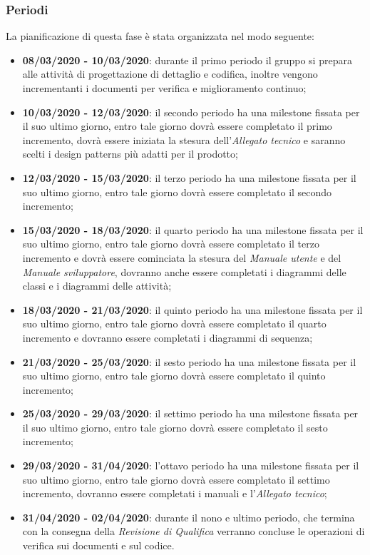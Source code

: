 \subsubsection{Periodi}
La pianificazione di questa fase è stata organizzata nel modo seguente:
\begin{itemize}
\item \textbf{08/03/2020 - 10/03/2020}: durante il primo periodo il gruppo si prepara alle attività di progettazione di dettaglio e codifica, inoltre vengono incrementanti i documenti per verifica e miglioramento continuo;

\item \textbf{10/03/2020 - 12/03/2020}: il secondo periodo ha una milestone fissata per il suo ultimo giorno, entro tale giorno dovrà essere completato il primo incremento, dovrà essere iniziata la stesura dell'\textit{Allegato tecnico} e saranno scelti i design patterns più adatti per il prodotto;

\item \textbf{12/03/2020 - 15/03/2020}: il terzo periodo ha una milestone fissata per il suo ultimo giorno, entro tale giorno dovrà essere completato il secondo incremento;

\item \textbf{15/03/2020 - 18/03/2020}: il quarto periodo ha una milestone fissata per il suo ultimo giorno, entro tale giorno dovrà essere completato il terzo incremento e dovrà essere cominciata la stesura del \textit{Manuale utente} e del \textit{Manuale sviluppatore}, dovranno anche essere completati i diagrammi delle classi e i diagrammi delle attività;

\item \textbf{18/03/2020 - 21/03/2020}: il quinto periodo ha una milestone fissata per il suo ultimo giorno, entro tale giorno dovrà essere completato il quarto incremento e dovranno essere completati i diagrammi di sequenza;

\item \textbf{21/03/2020 - 25/03/2020}: il sesto periodo ha una milestone fissata per il suo ultimo giorno, entro tale giorno dovrà essere completato il quinto incremento;

\item \textbf{25/03/2020 - 29/03/2020}: il settimo periodo ha una milestone fissata per il suo ultimo giorno, entro tale giorno dovrà essere completato il sesto incremento;

\item \textbf{29/03/2020 - 31/04/2020}: l'ottavo periodo ha una milestone fissata per il suo ultimo giorno, entro tale giorno dovrà essere completato il settimo incremento, dovranno essere completati i manuali e l'\textit{Allegato tecnico};

\item \textbf{31/04/2020 - 02/04/2020}: durante il nono e ultimo periodo, che termina con la consegna della \textit{Revisione di Qualifica} verranno concluse le operazioni di verifica sui documenti e sul codice.

\end{itemize}

